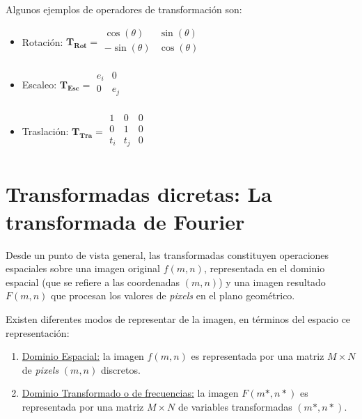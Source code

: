 %
Algunos ejemplos de operadores de transformaci\'on son:

\begin{itemize}
 \item Rotaci\'on: $\mathbf{T_{Rot}} = \begin{array}{cc} \cos(\theta) & \sin(\theta)  \\  -\sin(\theta) & \cos(\theta) \\ \end{array}$
 \item Escaleo: $\mathbf{T_{Esc}} = \begin{array}{cc} e_{i} & 0  \\  0 & e_{j} \\ \end{array}$
 \item Traslaci\'on: $\mathbf{T_{Tra}} = \begin{array}{ccc} 1 & 0 & 0 \\  0 & 1 & 0 \\ t_{i} & t_{j} & 0 \\ \end{array}$
\end{itemize}


\section{Transformadas dicretas: La transformada de Fourier}

Desde un punto de vista general, las transformadas constituyen operaciones espaciales sobre una imagen original $f(m, n)$, representada en el dominio 
espacial (que se refiere a las coordenadas $(m, n)$) y una imagen resultado $F(m, n)$ que procesan los valores de \textit{pixels} en el plano geom\'etrico.
%

%
Existen diferentes modos de representar de la imagen, en t\'erminos del espacio ce representaci\'on:
\begin{enumerate}
 \item \underline{ Dominio Espacial:} la imagen $f(m, n)$ es representada por una matriz $M \times N$ de \textit{pixels} $(m, n)$ discretos.
 \item \underline{ Dominio Transformado o de frecuencias:} la imagen $F(m*, n*)$ es representada por una matriz $M \times N$ de variables transformadas 
 $(m*, n*)$. 
\end{enumerate}

